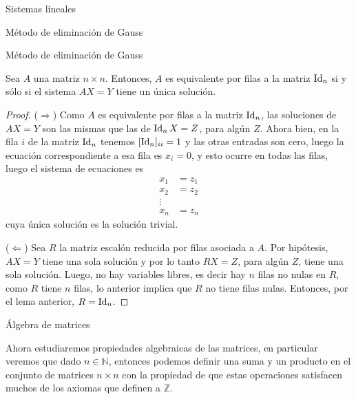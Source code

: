 \begin{chapter}{Sistemas lineales}
\begin{section}{Método de eliminación de Gauss }
\begin{subsection}{Método de eliminación de Gauss}
                \begin{teorema}
                    Sea $A$ una matriz $n \times n$. Entonces, $A$ es equivalente por filas a la matriz $\operatorname{Id}_n$  si y sólo si el sistema $AX = Y$ tiene un única solución. 
                \end{teorema}
                \begin{proof}
                    ($\Rightarrow$) Como $A$ es equivalente por filas a la matriz $\operatorname{Id}_n$, las soluciones de $AX =Y$ son las mismas que las de $\operatorname{Id}_nX=Z$, para algún $Z$. Ahora bien,  en la fila $i$ de la matriz $\operatorname{Id}_n$ tenemos $[\operatorname{Id}_n]_{ii} =1$ y las otras entradas son cero, luego la ecuación correspondiente a esa fila es $x _i =0$, y esto ocurre en todas las filas, luego el sistema de ecuaciones es
                    \begin{align*}
                    x_1 &=z_1 \\ x_2 &= z_2 \\ \vdots \\ x_n &= z_n
                    \end{align*}
                    cuya única solución es la solución trivial.
                    
                    ($\Leftarrow$) Sea $R$ la matriz escalón reducida por filas asociada a $A$. Por hipótesis, $AX=Y$ tiene una sola solución y  por lo tanto $RX=Z$, para algún $Z$, tiene una sola solución. Luego, no hay variables libres, es decir hay $n$ filas no nulas en $R$, como $R$ tiene $n$ filas, lo anterior implica que $R$ no tiene filas nulas. Entonces, por el lema anterior, $R=\operatorname{Id}_n$.
                \end{proof}
        
            
            
            
                \end{subsection}
            
            
        \end{section}
        
        
        
        
        
        
        
        
        \begin{section}{\'Algebra de matrices}\label{seccion-algebra-de-matrices}
            
            Ahora estudiaremos propiedades algebraicas de las matrices,  en particular veremos que dado $n\in \mathbb N$, entonces podemos definir una suma y un producto en el conjunto de matrices $n \times n$ con la propiedad de que estas operaciones satisfacen muchos de los axiomas que definen a  $\mathbb Z$.  
            

\end{section}
\end{chapter}
